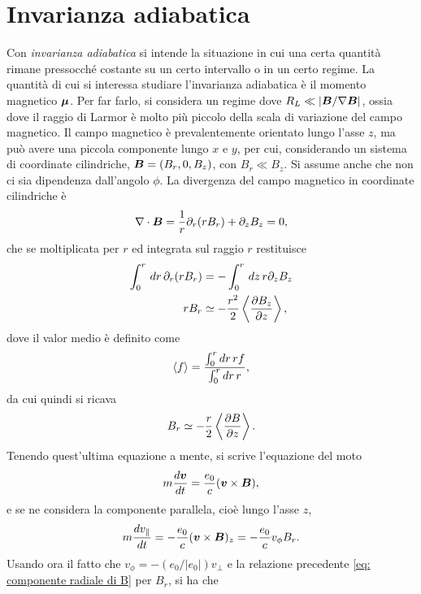\section{Invarianza adiabatica}
Con \emph{invarianza adiabatica} si intende la situazione in cui una certa quantità rimane pressocché costante su un certo intervallo o in un certo regime. La quantità di cui si interessa studiare l'invarianza adiabatica è il momento magnetico $\bm{\mu}$. Per far farlo, si considera un regime dove $R_L \ll |\bm{B}/\nabla \bm{B}|$, ossia dove il raggio di Larmor è molto più piccolo della scala di variazione del campo magnetico. Il campo magnetico è prevalentemente orientato lungo l'asse $z$, ma può avere una piccola componente lungo $x$ e $y$, per cui, considerando un sistema di coordinate cilindriche, $\bm{B} = (B_r,0,B_z)$, con $B_r \ll B_z$. Si assume anche che non ci sia dipendenza dall'angolo $\phi$. La divergenza del campo magnetico in coordinate cilindriche è
\begin{equation}
    \nabla \cdot \bm{B} = \frac{1}{r}\partial_r(rB_r) + \partial_zB_z = 0,
\end{equation}
che se moltiplicata per $r$ ed integrata sul raggio $r$ restituisce
\begin{equation}
    \begin{split}
        \int_0^r\,dr\,\partial_r(rB_r) &= -\int_0^r\,dz\,r\partial_zB_z \\
        rB_r &\simeq -\frac{r^2}{2}\left\langle \frac{\partial B_z}{\partial z} \right\rangle,
    \end{split}
\end{equation}
dove il valor medio è definito come 
\begin{equation}
    \langle f \rangle = \frac{\int_0^rdr\,rf}{\int_0^rdr\,r},
\end{equation}
da cui quindi si ricava
\begin{equation}
\label{eq: componente radiale di B}
    B_r \simeq -\frac{r}{2}\left\langle \frac{\partial B}{\partial z} \right\rangle.
\end{equation}
Tenendo quest'ultima equazione a mente, si scrive l'equazione del moto
\begin{equation}
    m\frac{d\bm{v}}{dt} = \frac{e_0}{c}(\bm{v} \times \bm{B}),
\end{equation}
e se ne considera la componente parallela, cioè lungo l'asse $z$,
\begin{equation}
    m\frac{dv_\parallel}{dt} = -\frac{e_0}{c}(\bm{v} \times \bm{B})_z = -\frac{e_0}{c}v_\phi B_r.
\end{equation}
Usando ora il fatto che $v_\phi = -(e_0/|e_0|)v_\perp$ e la relazione precedente \eqref{eq: componente radiale di B} per $B_r$, si ha che 
